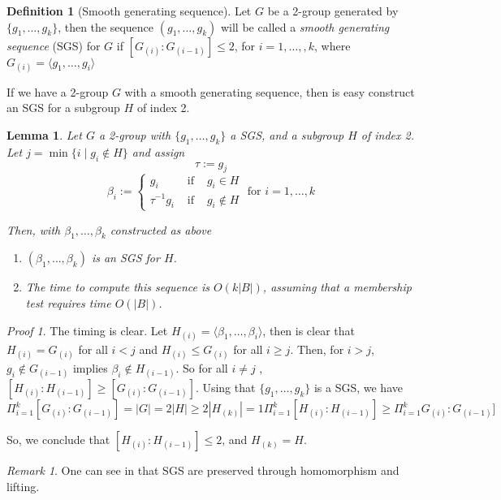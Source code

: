 \documentclass[12pt,a4paper]{book}
\theoremstyle{plain}
\newtheorem{lema}{Lemma}
\theoremstyle{definition}
\newtheorem{definition}{Definition}
\theoremstyle{remark}
\newtheorem{remark}{Remark}
\newtheorem*{Proof}{Proof}
\begin{document}
\begin{definition}[Smooth generating sequence]
 Let $G$ be a 2-group generated by $\{g_1, \ldots, g_k \}$, then the sequence $( g_1, \ldots, g_k )$ will be called a \emph{smooth 
 generating sequence} (SGS) for $G$ if $[ G_{(i)} : G_{(i-1)}] \leq 2$, for $i=1, \ldots, ,k$, where $G_{(i)} = \langle g_1, \ldots, 
 g_i \rangle$
\end{definition}

If we have a 2-group $G$ with a smooth generating sequence, then is easy construct an SGS for a subgroup $H$ of index 2.

\begin{lema}
 Let $G$ a 2-group with $ \{ g_1, \ldots, g_k \}$ a SGS, and a subgroup $H$ of index 2. Let $j = \min \{ i \; | \; g_i \notin H \}$ 
 and assign 
 \[
  \tau := g_j 
 \]
 \[
  \beta_i := \left\{ \begin{array}{lcl} g_i & \mbox{ if } & g_i \in H \\ \tau^{-1} g_i & \mbox{ if } & g_i \notin H \end{array} 
  \right. \mbox{ for } i = 1, \ldots, k
 \]

 Then, with $\beta_1, \ldots, \beta_k$ constructed as above
 \begin{enumerate}
  \item $(\beta_1, \ldots, \beta_k )$ is an SGS for $H$.
  \item The time to compute this sequence is $O(k |B|)$, assuming that a membership test requires time $O(|B|)$.
 \end{enumerate}
\end{lema}

\begin{Proof}
 The timing is clear. Let $H_{(i)} = \langle \beta_1 , \ldots, \beta_i \rangle$, then is clear that $H_{(i)} = G_{(i)}$ for all $i < j$ and
 $H_{(i)} \leq G_{(i)}$ for all $i \geq j$. Then, for $i>j$, $g_i \notin G_{(i-1)}$ implies $\beta_i \notin H_{(i-1)}$. 
 So for all $i \neq j$ , $[ H_{(i)} : H_{(i-1)}] \geq [G_{(i)} : G_{(i-1)} ] $. Using that $\{ g_1, \ldots, g_k \}$ is a SGS, we have 
 \[
  \Pi_{i=1}^k [ G_{(i)}: G_{(i-1)}] = | G | = 2 |H| \geq 2 | H_{(k)}| = 1 \Pi_{i=1}^k [ H_{(i)}: H_{(i-1)} ] \geq \Pi_{i=1}^k 
  G_{(i)} : G_{(i-1)} ]
 \]
 
 So, we conclude that $[ H_{(i)}: H_{(i-1)} ] \leq 2$, and $H_{(k)} = H$.
 
\end{Proof}

\begin{remark}
 One can see in \cite{ GaHoLuScWe87} that SGS are preserved through homomorphism and lifting.
\end{remark}
\end{document}
